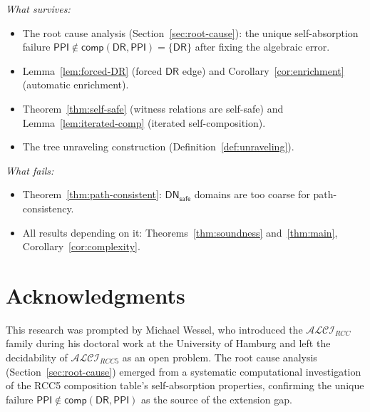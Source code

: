 \documentclass[a4paper,11pt]{article}
\theoremstyle{definition}
\newcommand{\ALCIRCC}[1]{\ensuremath{\mathcal{ALCI}_{\mathit{RCC#1}}}}
\newcommand{\DR}{\ensuremath{\mathsf{DR}}}
\newcommand{\PPI}{\ensuremath{\mathsf{PPI}}}
\newcommand{\comp}{\ensuremath{\mathsf{comp}}}
\newcommand{\DN}{\ensuremath{\mathsf{DN}}}
\begin{document}
\emph{What survives:}
\begin{itemize}[nosep]
  \item The root cause analysis (Section~\ref{sec:root-cause}):
    the unique self-absorption failure
    $\PPI \notin \comp(\DR, \PPI) = \{\DR\}$ after fixing the
    algebraic error.
  \item Lemma~\ref{lem:forced-DR} (forced $\DR$ edge) and
    Corollary~\ref{cor:enrichment} (automatic enrichment).
  \item Theorem~\ref{thm:self-safe} (witness relations are self-safe)
    and Lemma~\ref{lem:iterated-comp} (iterated self-composition).
  \item The tree unraveling construction
    (Definition~\ref{def:unraveling}).
\end{itemize}

\emph{What fails:}
\begin{itemize}[nosep]
  \item Theorem~\ref{thm:path-consistent}: $\DN_{\mathsf{safe}}$
    domains are too coarse for path-consistency.
  \item All results depending on it: Theorems~\ref{thm:soundness}
    and~\ref{thm:main}, Corollary~\ref{cor:complexity}.
\end{itemize}


\section*{Acknowledgments}

This research was prompted by Michael Wessel, who introduced the
$\ALCIRCC{}$ family during his doctoral work at the University of
Hamburg and left the decidability of $\ALCIRCC{5}$ as an open problem.
The root cause analysis (Section~\ref{sec:root-cause}) emerged from a
systematic computational investigation of the RCC5 composition table's
self-absorption properties, confirming the unique failure
$\PPI \notin \comp(\DR, \PPI)$ as the source of the extension gap.
\end{document}
